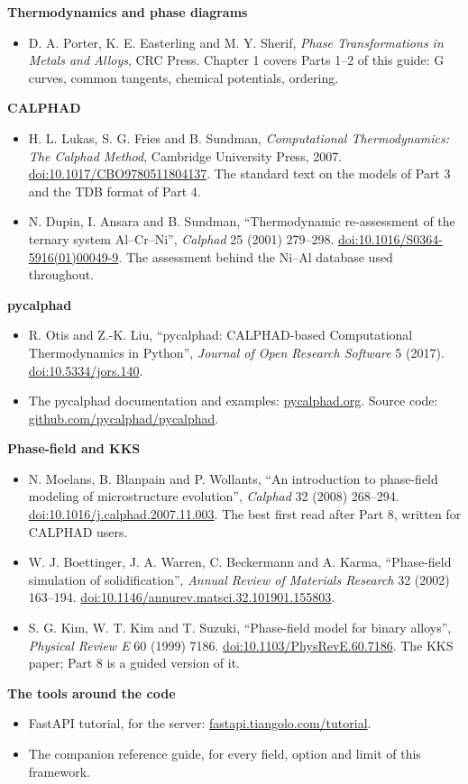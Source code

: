 \documentclass[12pt,a4paper]{article}
\begin{document}
\textbf{Thermodynamics and phase diagrams}

\begin{itemize}
\item D. A. Porter, K. E. Easterling and M. Y. Sherif, \textit{Phase Transformations in Metals and Alloys}, CRC Press. Chapter 1 covers Parts 1--2 of this guide: G curves, common tangents, chemical potentials, ordering.
\end{itemize}
\textbf{CALPHAD}

\begin{itemize}
\item H. L. Lukas, S. G. Fries and B. Sundman, \textit{Computational Thermodynamics: The Calphad Method}, Cambridge University Press, 2007. \href{https://doi.org/10.1017/CBO9780511804137}{doi:10.1017/CBO9780511804137}. The standard text on the models of Part 3 and the TDB format of Part 4.
\item N. Dupin, I. Ansara and B. Sundman, ``Thermodynamic re-assessment of the ternary system Al--Cr--Ni'', \textit{Calphad} 25 (2001) 279--298. \href{https://doi.org/10.1016/S0364-5916(01)00049-9}{doi:10.1016/S0364-5916(01)00049-9}. The assessment behind the Ni--Al database used throughout.
\end{itemize}
\textbf{pycalphad}

\begin{itemize}
\item R. Otis and Z.-K. Liu, ``pycalphad: CALPHAD-based Computational Thermodynamics in Python'', \textit{Journal of Open Research Software} 5 (2017). \href{https://doi.org/10.5334/jors.140}{doi:10.5334/jors.140}.
\item The pycalphad documentation and examples: \href{https://pycalphad.org}{pycalphad.org}. Source code: \href{https://github.com/pycalphad/pycalphad}{github.com/pycalphad/pycalphad}.
\end{itemize}
\textbf{Phase-field and KKS}

\begin{itemize}
\item N. Moelans, B. Blanpain and P. Wollants, ``An introduction to phase-field modeling of microstructure evolution'', \textit{Calphad} 32 (2008) 268--294. \href{https://doi.org/10.1016/j.calphad.2007.11.003}{doi:10.1016/j.calphad.2007.11.003}. The best first read after Part 8, written for CALPHAD users.
\item W. J. Boettinger, J. A. Warren, C. Beckermann and A. Karma, ``Phase-field simulation of solidification'', \textit{Annual Review of Materials Research} 32 (2002) 163--194. \href{https://doi.org/10.1146/annurev.matsci.32.101901.155803}{doi:10.1146/annurev.matsci.32.101901.155803}.
\item S. G. Kim, W. T. Kim and T. Suzuki, ``Phase-field model for binary alloys'', \textit{Physical Review E} 60 (1999) 7186. \href{https://doi.org/10.1103/PhysRevE.60.7186}{doi:10.1103/PhysRevE.60.7186}. The KKS paper; Part 8 is a guided version of it.
\end{itemize}
\textbf{The tools around the code}

\begin{itemize}
\item FastAPI tutorial, for the server: \href{https://fastapi.tiangolo.com/tutorial/}{fastapi.tiangolo.com/tutorial}.
\item The companion reference guide, for every field, option and limit of this framework.
\end{itemize}
\end{document}
